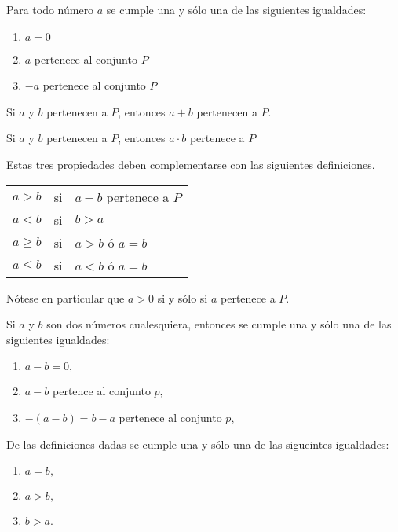 \begin{prop} Para todo número $a$ se cumple una y sólo una de las siguientes igualdades:
\begin{enumerate}[\bfseries i)]
\item $a=0$
\item $a$ pertenece al conjunto $P$
\item $-a$ pertenece al conjunto $P$
\end{enumerate}
\end{prop}

\begin{prop} Si $a$ y $b$ pertenecen a $P$, entonces $a+b$ pertenecen a $P$.
\end{prop}

\begin{prop} Si $a$ y $b$ pertenecen a $P$, entonces $a\cdot b$ pertenece a $P$
\end{prop}

\begin{def.} Estas tres propiedades deben complementarse con las siguientes definiciones.
\begin{center}
\begin{tabular}{r c l}
$a>b$&si&$a-b$ pertenece a $P$\\
$a<b$&si&$b>a$\\
$a\geq b $&si&$a>b$ ó $a=b$\\
$a\leq b$&si&$a<b$ ó $a=b$\\
\end{tabular}
Nótese en particular que $a>0$ si y sólo si $a$ pertenece a $P$.\\
\end{center}
\end{def.}

\begin{def.}
Si $a$ y $b$ son dos números cualesquiera, entonces se cumple una y sólo una de las siguientes igualdades:
\begin{enumerate}[\bfseries i)]
\item $a-b=0,$
\item $a-b$ pertence al conjunto $p,$
\item $-(a-b) = b-a$ pertenece al conjunto $p,$
\end{enumerate}
De las definiciones dadas se cumple una y sólo una de las sigueintes igualdades:
\begin{enumerate}[\bfseries i)]
\item $a=b,$
\item  $a>b,$
\item $b>a.$
\end{enumerate}
\end{def.}

